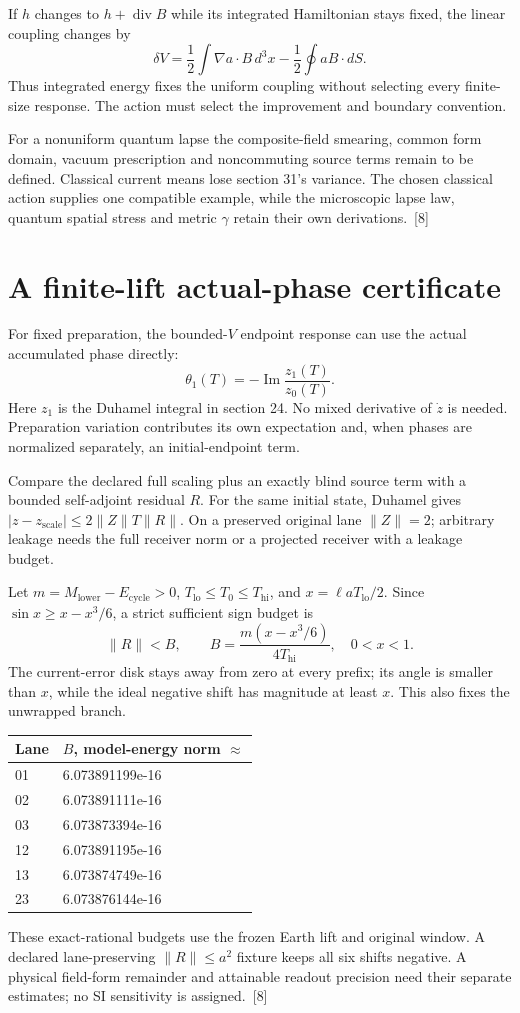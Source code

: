 \documentclass[10pt,twocolumn,letterpaper]{article}
\begin{document}
If $h$ changes to $h+\operatorname{div}B$ while its integrated Hamiltonian stays fixed, the linear coupling changes by
\[
\delta V=\frac12\int\nabla a\cdot B\,d^3x-\frac12\oint aB\cdot dS.
\]
Thus integrated energy fixes the uniform coupling without selecting every finite-size response. The action must select the improvement and boundary convention.

For a nonuniform quantum lapse the composite-field smearing, common form domain, vacuum prescription and noncommuting source terms remain to be defined. Classical current means lose section 31's variance. The chosen classical action supplies one compatible example, while the microscopic lapse law, quantum spatial stress and metric $\gamma$ retain their own derivations.~[8]

\section{A finite-lift actual-phase certificate}
For fixed preparation, the bounded-$V$ endpoint response can use the actual accumulated phase directly:
\[
\theta_1(T)=-\operatorname{Im}\frac{z_1(T)}{z_0(T)}.
\]
Here $z_1$ is the Duhamel integral in section 24. No mixed derivative of $\dot z$ is needed. Preparation variation contributes its own expectation and, when phases are normalized separately, an initial-endpoint term.

Compare the declared full scaling plus an exactly blind source term with a bounded self-adjoint residual $R$. For the same initial state, Duhamel gives $|z-z_{\mathrm{scale}}|\leq2\lVert Z\rVert T\lVert R\rVert$. On a preserved original lane $\lVert Z\rVert=2$; arbitrary leakage needs the full receiver norm or a projected receiver with a leakage budget.

Let $m=M_{\mathrm{lower}}-E_{\mathrm{cycle}}>0$, $T_{\mathrm{lo}}\leq T_0\leq T_{\mathrm{hi}}$, and $x=\ell aT_{\mathrm{lo}}/2$. Since $\sin x\geq x-x^3/6$, a strict sufficient sign budget is
\[
\lVert R\rVert<B,\qquad B=\frac{m(x-x^3/6)}{4T_{\mathrm{hi}}},\quad 0<x<1.
\]
The current-error disk stays away from zero at every prefix; its angle is smaller than $x$, while the ideal negative shift has magnitude at least $x$. This also fixes the unwrapped branch.

\begin{center}\small
\begin{tabular}{@{}ll@{}}\toprule
Lane & $B$, model-energy norm $\approx$\\\midrule
01 & 6.073891199e-16\\
02 & 6.073891111e-16\\
03 & 6.073873394e-16\\
12 & 6.073891195e-16\\
13 & 6.073874749e-16\\
23 & 6.073876144e-16\\\bottomrule
\end{tabular}\end{center}
These exact-rational budgets use the frozen Earth lift and original window. A declared lane-preserving $\lVert R\rVert\leq a^2$ fixture keeps all six shifts negative. A physical field-form remainder and attainable readout precision need their separate estimates; no SI sensitivity is assigned.~[8]
\end{document}

